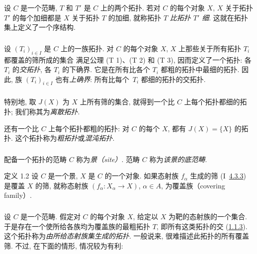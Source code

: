 设 $C$ 是一个范畴, $T$ 和 $T'$ 是 $C$ 上的两个拓扑.
若对 $C$ 的每个对象 $X$,
$X$ 关于拓扑 $T'$ 的每个加细都是 $X$ 关于拓扑 $T$ 的加细,
就称拓扑 $T$ \emph{比拓扑 $T'$ 细}.
这就在拓扑集上定义了一个序结构.

\subsubsection{}

设 $(T_i)_{i\in I}$ 是 $C$ 上的一族拓扑.
对 $C$ 的每个对象 $X$,
$X$ 上那些关于所有拓扑 $T_i$ 都覆盖的筛所成的集合
满足公理 (T 1)、(T 2) 和 (T 3), 因而定义了一个拓扑:
各 $T_i$ 的\emph{交拓扑}, \ie 各 $T_i$ 的下确界.
它是在所有比各个 $T_i$ 都粗的拓扑中最细的拓扑.
因此, 族 $(T_i)_{i \in I}$ 也有\emph{上确界}:
所有比每个~$T_i$ 都细的拓扑的交拓扑.

\subsubsection{}
特别地\pageoriginale{}, 取 $J(X)$ 为 $X$ 上所有筛的集合,
就得到一个比 $C$ 上每个拓扑都细的拓扑;
我们称其为\emph{离散拓扑}.

还有一个比 $C$ 上每个拓扑都粗的拓扑:
对 $C$ 的每个 $X$, 都有 $J(X)=\{X\}$ 的拓扑.
这个拓扑称为\emph{粗拓扑}或\emph{混沌拓扑}.

\subsubsection{}
配备一个拓扑的范畴 $C$ 称为\emph{景（site）}.
范畴 $C$ 称为\emph{该景的底范畴}.

\begin{enonce*}{定义 1.2}
设 $C$ 是一个景, $X$ 是 $C$ 的一个对象.
如果态射族 $f_{\alpha}$ 生成的筛
{\rm(I~\hyperref[I.sec4.3.3]{4.3.3})} 是覆盖 $X$ 的筛,
就称态射族 $(f_{\alpha}:X_{\alpha}\rightarrow X)$, $\alpha\in A$,
为覆盖族（covering family）.
\end{enonce*}

\subsubsection{}
设 $C$ 是一个范畴.
假定对 $C$ 的每个对象 $X$, 给定以 $X$ 为靶的态射族的一个集合.
于是存在一个使所给各族均为覆盖族的最粗拓扑 $T$,
即所有这类拓扑的交 (\hyperref[II.subsubsec1.1.3]{1.1.3}).
这个拓扑称为\emph{由所给态射族集生成的拓扑}.
一般说来, 很难描述此拓扑的所有覆盖筛.
不过, 在下面的情形, 情况较为有利:

